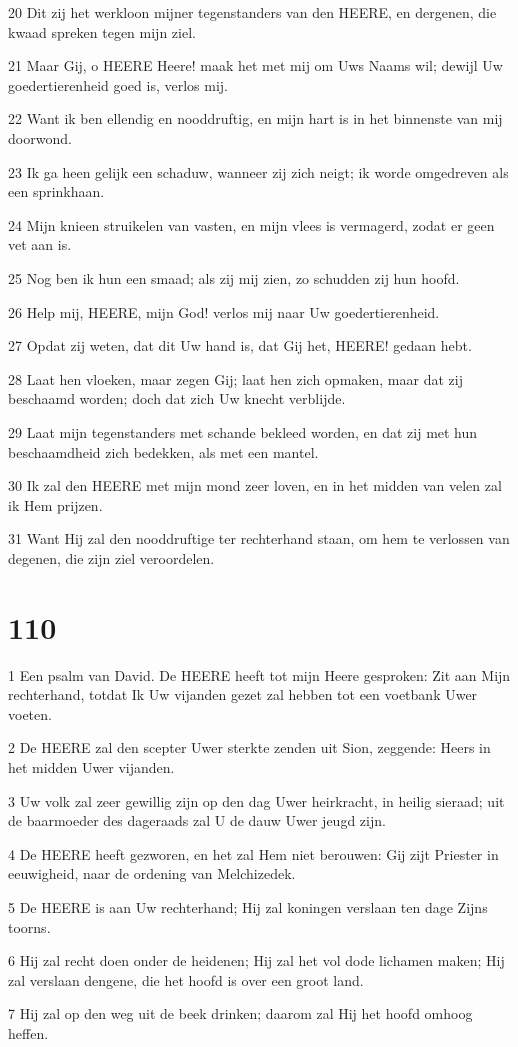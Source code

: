 \par 20 Dit zij het werkloon mijner tegenstanders van den HEERE, en dergenen, die kwaad spreken tegen mijn ziel.
\par 21 Maar Gij, o HEERE Heere! maak het met mij om Uws Naams wil; dewijl Uw goedertierenheid goed is, verlos mij.
\par 22 Want ik ben ellendig en nooddruftig, en mijn hart is in het binnenste van mij doorwond.
\par 23 Ik ga heen gelijk een schaduw, wanneer zij zich neigt; ik worde omgedreven als een sprinkhaan.
\par 24 Mijn knieen struikelen van vasten, en mijn vlees is vermagerd, zodat er geen vet aan is.
\par 25 Nog ben ik hun een smaad; als zij mij zien, zo schudden zij hun hoofd.
\par 26 Help mij, HEERE, mijn God! verlos mij naar Uw goedertierenheid.
\par 27 Opdat zij weten, dat dit Uw hand is, dat Gij het, HEERE! gedaan hebt.
\par 28 Laat hen vloeken, maar zegen Gij; laat hen zich opmaken, maar dat zij beschaamd worden; doch dat zich Uw knecht verblijde.
\par 29 Laat mijn tegenstanders met schande bekleed worden, en dat zij met hun beschaamdheid zich bedekken, als met een mantel.
\par 30 Ik zal den HEERE met mijn mond zeer loven, en in het midden van velen zal ik Hem prijzen.
\par 31 Want Hij zal den nooddruftige ter rechterhand staan, om hem te verlossen van degenen, die zijn ziel veroordelen.

\chapter{110}

\par 1 Een psalm van David. De HEERE heeft tot mijn Heere gesproken: Zit aan Mijn rechterhand, totdat Ik Uw vijanden gezet zal hebben tot een voetbank Uwer voeten.
\par 2 De HEERE zal den scepter Uwer sterkte zenden uit Sion, zeggende: Heers in het midden Uwer vijanden.
\par 3 Uw volk zal zeer gewillig zijn op den dag Uwer heirkracht, in heilig sieraad; uit de baarmoeder des dageraads zal U de dauw Uwer jeugd zijn.
\par 4 De HEERE heeft gezworen, en het zal Hem niet berouwen: Gij zijt Priester in eeuwigheid, naar de ordening van Melchizedek.
\par 5 De HEERE is aan Uw rechterhand; Hij zal koningen verslaan ten dage Zijns toorns.
\par 6 Hij zal recht doen onder de heidenen; Hij zal het vol dode lichamen maken; Hij zal verslaan dengene, die het hoofd is over een groot land.
\par 7 Hij zal op den weg uit de beek drinken; daarom zal Hij het hoofd omhoog heffen.

